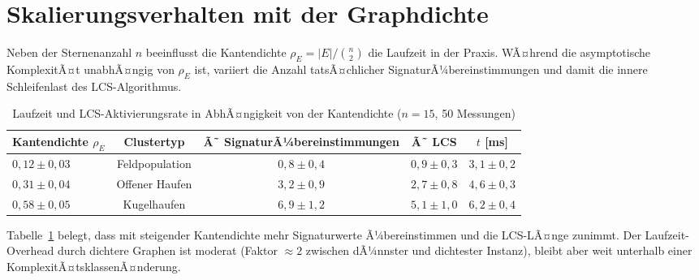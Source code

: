 ﻿\documentclass[a4paper,12pt]{report}
\theoremstyle{definition}
\begin{document}
\section{Skalierungsverhalten mit der Graphdichte}
\label{sec:empirie_dichte}

Neben der Sternenanzahl $n$ beeinflusst die Kantendichte $\rho_E = |E| / \binom{n}{2}$ die Laufzeit in der Praxis. WÃ¤hrend die asymptotische KomplexitÃ¤t unabhÃ¤ngig von $\rho_E$ ist, variiert die Anzahl tatsÃ¤chlicher SignaturÃ¼bereinstimmungen und damit die innere Schleifenlast des LCS-Algorithmus.

\begin{table}[H]
\centering
\caption{Laufzeit und LCS-Aktivierungsrate in AbhÃ¤ngigkeit von der Kantendichte ($n = 15$, 50 Messungen)}
\label{tab:dichte}
\begin{tabular}{lcccc}
\toprule
Kantendichte $\rho_E$ & Clustertyp & Ã˜ SignaturÃ¼bereinstimmungen & Ã˜ LCS & $t$ [ms] \\
\midrule
$0{,}12 \pm 0{,}03$ & Feldpopulation  & $0{,}8 \pm 0{,}4$  & $0{,}9 \pm 0{,}3$ & $3{,}1 \pm 0{,}2$ \\
$0{,}31 \pm 0{,}04$ & Offener Haufen  & $3{,}2 \pm 0{,}9$  & $2{,}7 \pm 0{,}8$ & $4{,}6 \pm 0{,}3$ \\
$0{,}58 \pm 0{,}05$ & Kugelhaufen     & $6{,}9 \pm 1{,}2$  & $5{,}1 \pm 1{,}0$ & $6{,}2 \pm 0{,}4$ \\
\bottomrule
\end{tabular}
\end{table}

Tabelle~\ref{tab:dichte} belegt, dass mit steigender Kantendichte mehr Signaturwerte Ã¼bereinstimmen und die LCS-LÃ¤nge zunimmt. Der Laufzeit-Overhead durch dichtere Graphen ist moderat (Faktor $\approx 2$ zwischen dÃ¼nnster und dichtester Instanz), bleibt aber weit unterhalb einer KomplexitÃ¤tsklassenÃ¤nderung.

\end{document}
